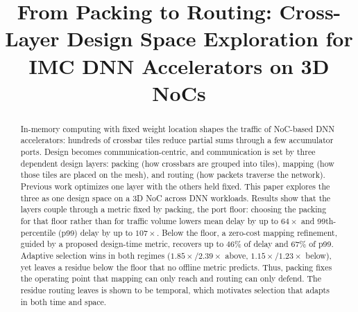 \documentclass[conference]{IEEEtran}
\newcommand{\todo}[1]{\textcolor{red}{[TODO: #1]}}
\begin{document}
\title{From Packing to Routing: Cross-Layer Design Space Exploration for IMC
DNN Accelerators on 3D NoCs}


\maketitle

\begin{abstract}
In-memory computing with fixed weight location shapes the traffic of NoC-based DNN accelerators: hundreds of crossbar tiles reduce
partial sums through a few accumulator ports. Design becomes communication-centric, and communication is set by three
dependent design layers: packing (how crossbars are grouped into tiles),
mapping (how those tiles are placed on the mesh), and routing (how packets
traverse the network). Previous work optimizes one layer with the others held
fixed. This paper explores the three as one design space on a 3D NoC across
DNN workloads. Results show that the layers couple through a metric fixed by
packing, the port floor: choosing the packing for that floor rather than for
traffic volume lowers mean delay by up to $64\times$ and 99th-percentile
(p99) delay by up to $107\times$. Below the floor, a zero-cost mapping refinement, guided by a proposed design-time metric, recovers up to
$46\%$ of delay and $67\%$ of p99. Adaptive selection wins in both regimes
($1.85\times$/$2.39\times$ above, $1.15\times$/$1.23\times$ below), yet leaves
a residue below the floor that no offline metric predicts. Thus, packing fixes the operating point that mapping can only reach and routing can only defend. The residue routing leaves is shown to be temporal, which motivates selection that adapts in both time and space.
\end{abstract}









\end{document}

